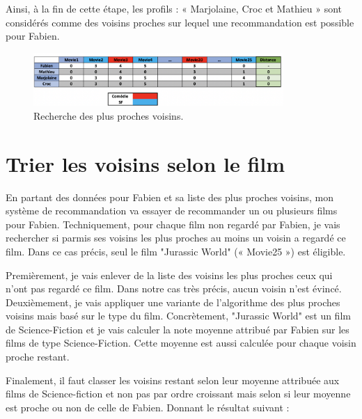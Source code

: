 \vspace{5mm}
 
Ainsi, à la fin de cette étape, les profils :  « Marjolaine, Croc et Mathieu »  sont considérés comme des voisins proches sur lequel une recommandation est possible pour Fabien. 

\begin{figure}[htp]
  \centering
  \includegraphics[width=95mm]{./src_img/apport_distance}
  \caption{Recherche des plus proches voisins.}
  \label{fig:a-deux}
\end{figure}

\vspace{5mm}


\section{Trier les voisins selon le film}

En partant des données pour Fabien et sa liste des plus proches voisins, mon système de recommandation va essayer de recommander un ou plusieurs films pour Fabien. Techniquement, pour chaque film non regardé par Fabien, je vais rechercher si parmis ses voisins les plus proches au moins un voisin a regardé ce film. Dans ce cas précis, seul le film "Jurassic World" (« Movie25 ») est éligible.

\vspace{5mm}

Premièrement, je vais enlever de la liste des voisins les plus proches ceux qui n’ont pas regardé ce film. Dans notre cas très précis, aucun voisin n’est évincé. Deuxièmement, je vais appliquer une variante de l’algorithme des plus proches voisins mais basé sur le type du film. Concrètement, "Jurassic World" est un film de Science-Fiction et je vais calculer la note moyenne attribué par Fabien sur les films de type Science-Fiction. Cette moyenne est aussi calculée pour chaque voisin proche restant. 

\vspace{5mm}

Finalement, il faut classer les voisins restant selon leur moyenne attribuée aux films de Science-fiction et non pas par ordre croissant mais selon si leur moyenne est proche ou non de celle de Fabien. Donnant le résultat suivant : 


